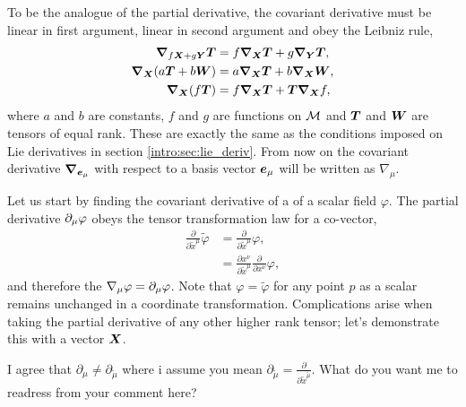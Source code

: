 To be the analogue of the partial derivative, the covariant derivative must be linear in first argument, linear in second argument and obey the Leibniz rule,
\begin{align}
\label{intro:eq:cov-lin}\boldsymbol{\nabla}_{f\boldsymbol{X} + g\boldsymbol{Y}}\boldsymbol{T} &= f\boldsymbol{\nabla}_{\boldsymbol{X}}\boldsymbol{T} + g\boldsymbol{\nabla}_{\boldsymbol{Y}}\boldsymbol{T} , \\
\label{intro:eq:cov-ass}\boldsymbol{\nabla}_{\boldsymbol{X}}( a\boldsymbol{T} + b\boldsymbol{W}) &= a\boldsymbol{\nabla}_{\boldsymbol{X}}\boldsymbol{T} + b\boldsymbol{\nabla}_{\boldsymbol{X}}\boldsymbol{W} , \\
\label{intro:eq:cov-pro}\boldsymbol{\nabla}_{\boldsymbol{X}}( f\boldsymbol{T}) &= f\boldsymbol{\nabla}_{\boldsymbol{X}}\boldsymbol{T} + \boldsymbol{T} \boldsymbol{\nabla}_{\boldsymbol{X}}f , 
\end{align}
where $a$ and $b$ are constants, $f$ and $g$ are functions on $\mathcal{M}$ and $\boldsymbol{T}$ and $\boldsymbol{W}$ are tensors of equal rank. These are exactly the same as the conditions imposed on Lie derivatives in section \ref{intro:sec:lie_deriv}. From now on the covariant derivative $\boldsymbol{\nabla}_{\boldsymbol{e}_\mu}$ with respect to a basis vector $\boldsymbol{e}_\mu$ will be written as $\nabla_\mu$.

Let us start by finding the covariant derivative of a of a scalar field $\varphi$. The partial derivative $\partial_\mu \varphi$ obeys the tensor transformation law for a co-vector,
\begin{align}
\frac{\partial}{\partial \tilde{x}^\mu} \tilde{\varphi} &=\frac{\partial}{\partial \tilde{x}^\mu} {\varphi} ,\\
                                                        &=\frac{\partial x^\nu}{\partial\tilde{x}^\mu}\frac{\partial}{\partial {x}^\nu} {\varphi},
\end{align}
and therefore the $\nabla_\mu \varphi = \partial_\mu \varphi$. Note that $\varphi=\tilde{\varphi}$ for any point $p$ as a scalar remains unchanged in a coordinate transformation. Complications arise when taking the partial derivative of any other higher rank tensor; let's demonstrate this with a vector $\boldsymbol{X}$.

\color{choral} I agree that $\partial_\mu  \neq \partial_{\tilde{\mu}}$ where i assume you mean $\partial_{\tilde \mu} = \frac{\partial}{\partial \tilde{x}^{\tilde \mu}}$. What do you want me to readress from your comment here? \color{black}

